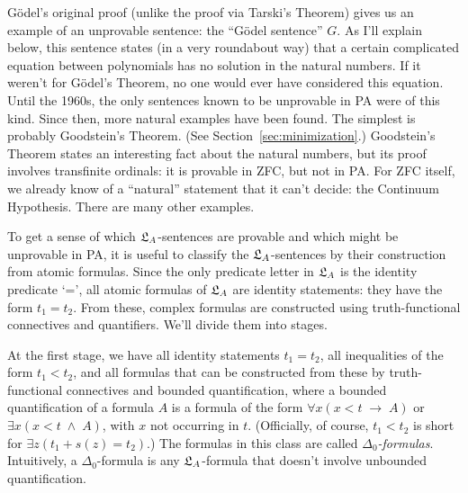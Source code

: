 Gödel's original proof
(unlike the proof via Tarski's Theorem)
gives us an example of an unprovable sentence:
the ``Gödel sentence'' $G$.
As I'll explain below,
this sentence states (in a very roundabout way) that
a certain complicated equation between polynomials has no solution in the natural numbers.
If it weren't for Gödel's Theorem,
no one would ever have considered this equation.
Until the 1960s,
the only sentences known to be unprovable in PA were of this kind.
Since then,
more natural examples have been found.
The simplest is probably Goodstein's Theorem.
(See Section~\ref{sec:minimization}.)
Goodstein's Theorem states an interesting fact about the natural numbers,
but its proof involves transfinite ordinals:
it is provable in ZFC, but not in PA.
For ZFC itself,
we already know of a ``natural'' statement that it can't decide:
the Continuum Hypothesis.
There are many other examples.

To get a sense of which $\mathfrak{L}_A$-sentences are provable and which might be unprovable in PA,
it is useful to classify the $\mathfrak{L}_A$-sentences by their construction from atomic formulas.
Since the only predicate letter in $\mathfrak{L}_A$ is the identity predicate `=',
all atomic formulas of $\mathfrak{L}_A$ are identity statements:
they have the form $t_1 = t_2$.
From these,
complex formulas are constructed using truth-functional connectives and quantifiers.
We'll divide them into stages.

At the first stage,
we have all identity statements $t_1 = t_2$,
all inequalities of the form $t_1 < t_2$,
and all formulas that can be constructed from these by truth-functional connectives
and bounded quantification,
where a bounded quantification of a formula $A$ is a formula of the form
$\forall x(x < t \;\to\; A)$ or $\exists x(x < t \;\land\; A)$,
with $x$ not occurring in $t$.
(Officially,
of course, $t_1 < t_2$ is short for $\exists z(t_1 + s(z) = t_2)$.)
The formulas in this class are called \emph{$\Delta_{0}$-formulas}.
Intuitively,
a $\Delta_{0}$-formula is any $\mathfrak{L}_A$-formula that doesn't involve unbounded quantification.


